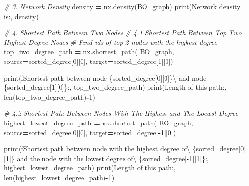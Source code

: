 \documentclass[
]{article}
\newenvironment{Shaded}{\begin{snugshade}}{\end{snugshade}}
\newcommand{\BuiltInTok}[1]{#1}
\newcommand{\CommentTok}[1]{\textcolor[rgb]{0.56,0.35,0.01}{\textit{#1}}}
\newcommand{\DecValTok}[1]{\textcolor[rgb]{0.00,0.00,0.81}{#1}}
\newcommand{\NormalTok}[1]{#1}
\newcommand{\OperatorTok}[1]{\textcolor[rgb]{0.81,0.36,0.00}{\textbf{#1}}}
\newcommand{\SpecialCharTok}[1]{\textcolor[rgb]{0.00,0.00,0.00}{#1}}
\newcommand{\SpecialStringTok}[1]{\textcolor[rgb]{0.31,0.60,0.02}{#1}}
\newcommand{\StringTok}[1]{\textcolor[rgb]{0.31,0.60,0.02}{#1}}
\begin{document}
\begin{Shaded}
\begin{Highlighting}[]
\CommentTok{\# 3. Network Density}
\NormalTok{density }\OperatorTok{=}\NormalTok{ nx.density(BO\_graph)}
\BuiltInTok{print}\NormalTok{(}\StringTok{\textquotesingle{}Network density is:\textquotesingle{}}\NormalTok{, density)}

\CommentTok{\# 4. Shortest Path Between Two Nodes}
\CommentTok{\# 4.1 Shortest Path Between Top Two Highest Degree Nodes}
\CommentTok{\# Find ids of top 2 nodes with the highest degree}
\NormalTok{top\_two\_degree\_path }\OperatorTok{=}\NormalTok{ nx.shortest\_path(}
\NormalTok{  BO\_graph, source}\OperatorTok{=}\NormalTok{sorted\_degree[}\DecValTok{0}\NormalTok{][}\DecValTok{0}\NormalTok{], target}\OperatorTok{=}\NormalTok{sorted\_degree[}\DecValTok{1}\NormalTok{][}\DecValTok{0}\NormalTok{])}

\BuiltInTok{print}\NormalTok{(}\SpecialStringTok{f\textquotesingle{}Shortest path between node }\SpecialCharTok{\{}\NormalTok{sorted\_degree[}\DecValTok{0}\NormalTok{][}\DecValTok{0}\NormalTok{]}\SpecialCharTok{\}}\SpecialStringTok{\textbackslash{}}
\SpecialStringTok{  and node }\SpecialCharTok{\{}\NormalTok{sorted\_degree[}\DecValTok{1}\NormalTok{][}\DecValTok{0}\NormalTok{]}\SpecialCharTok{\}}\SpecialStringTok{:\textquotesingle{}}\NormalTok{, top\_two\_degree\_path)}
\BuiltInTok{print}\NormalTok{(}\StringTok{\textquotesingle{}Length of this path:\textquotesingle{}}\NormalTok{, }\BuiltInTok{len}\NormalTok{(top\_two\_degree\_path)}\OperatorTok{{-}}\DecValTok{1}\NormalTok{)}

\CommentTok{\# 4.2 Shortest Path Between Nodes With The Highest and The Loewst Degree}
\NormalTok{highest\_lowest\_degree\_path }\OperatorTok{=}\NormalTok{ nx.shortest\_path(}
\NormalTok{  BO\_graph, source}\OperatorTok{=}\NormalTok{sorted\_degree[}\DecValTok{0}\NormalTok{][}\DecValTok{0}\NormalTok{], target}\OperatorTok{=}\NormalTok{sorted\_degree[}\OperatorTok{{-}}\DecValTok{1}\NormalTok{][}\DecValTok{0}\NormalTok{])}

\BuiltInTok{print}\NormalTok{(}\SpecialStringTok{f\textquotesingle{}Shortest path between node with the highest degree of\textbackslash{}}
\SpecialStringTok{  }\SpecialCharTok{\{}\NormalTok{sorted\_degree[}\DecValTok{0}\NormalTok{][}\DecValTok{1}\NormalTok{]}\SpecialCharTok{\}}\SpecialStringTok{ and the node with the lowest degree of\textbackslash{} }
\SpecialStringTok{  }\SpecialCharTok{\{}\NormalTok{sorted\_degree[}\OperatorTok{{-}}\DecValTok{1}\NormalTok{][}\DecValTok{1}\NormalTok{]}\SpecialCharTok{\}}\SpecialStringTok{:\textquotesingle{}}\NormalTok{,}
\NormalTok{  highest\_lowest\_degree\_path)}
\BuiltInTok{print}\NormalTok{(}\StringTok{\textquotesingle{}Length of this path:\textquotesingle{}}\NormalTok{, }\BuiltInTok{len}\NormalTok{(highest\_lowest\_degree\_path)}\OperatorTok{{-}}\DecValTok{1}\NormalTok{)}


\end{Highlighting}
\end{Shaded}
\end{document}
